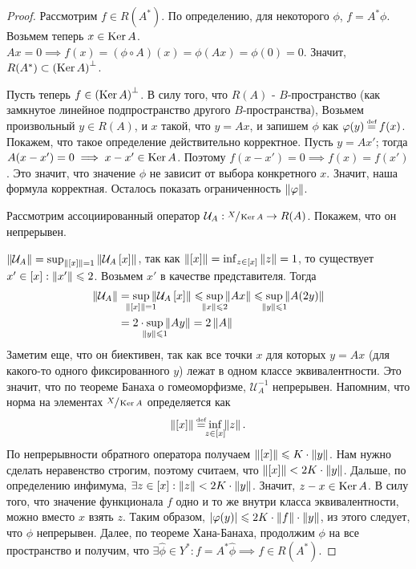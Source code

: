 \begin{proof}
	Рассмотрим $f \in R(A^*)$. По определению, для некоторого $\phi$, $f = A^*\phi$.
	Возьмем теперь $x \in \operatorname{Ker} A$. $Ax = 0 \implies f(x) = (\phi \circ A)(x) = \phi(Ax) = \phi(0) = 0$.
	Значит, $R(A^*) \subset \left( \operatorname{Ker} A\right)^\bot$.
	
	Пусть теперь $f \in \left( \operatorname{Ker} A\right)^\bot$. В силу того, что $R(A)$ - $B$-пространство
	(как замкнутое линейное подпространство другого $B$-пространства),
	Возьмем произвольный $y \in R(A)$, и $x$ такой, что $y = Ax$,
	и запишем $\phi$ как $\phi(y) \defeq f(x)$. Покажем, что такое определение
	действительно корректное.
	Пусть $y = Ax'$; тогда $A(x - x') = 0 \implies x - x' \in \operatorname{Ker} A$.
	Поэтому $f(x - x') = 0 \implies f(x) = f(x')$. Это значит, что значение $\phi$ не
	зависит от выбора конкретного $x$. Значит, наша формула корректная.
	Осталось показать ограниченность $\left\|\varphi\right\|$.

	Рассмотрим ассоциированный оператор
	$\mathcal{U}_A : \sfrac{X}{\operatorname{Ker} A} \rightarrow R(A)$.
	Покажем, что он непрерывен.

	$\left\|\mathcal{U}_A\right\| = \sup_{\left\|\left[x \right]\right\| = 1} \left\|\mathcal{U}_A\left[x \right]\right\|$,
	так как $\left\|\left[x \right]\right\| = \inf_{z \in \left[x \right]} \left\|z\right\| = 1$,
	то существует $x' \in \left[x \right] : \left\|x'\right\| \leqslant 2$.
	Возьмем $x'$ в качестве представителя. Тогда
	\begin{equation}
		\begin{split}
			\norm{\mathcal{U}_A} & =
            \sup_{\mathclap{\norm{\eqcls{x}} = 1}} \norm{\mathcal{U}_A\eqcls{x}}
            \leqslant \sup_{\mathclap{\norm{x} \leqslant 2}} \norm{Ax}
            \leqslant \sup_{\mathclap{\norm{y} \leqslant 1}} \norm{A(2y)} \\
            & = 2 \cdot \sup_{\mathclap{\norm{y} \leqslant 1}} \norm{Ay}
			= 2 \norm{A}
		\end{split}
	\end{equation}
	Заметим еще, что он биективен, так как все точки $x$ для которых $y = Ax$
	(для какого-то одного фиксированного $y$) лежат в одном классе эквивалентности.
    Это значит, что по теореме Банаха о гомеоморфизме, $\mathcal{U}_A^{-1}$ непрерывен.
    Напомним, что норма на элементах $\sfrac{X}{\operatorname{Ker} A}$ определяется как
	\begin{gather}
        \norm{\eqcls{x}} \defeq \inf_{\mathclap{z \in \eqcls{x}}} \norm{z}\text{.}
	\end{gather}
	По непрерывности обратного оператора получаем $\left\|\left[x \right]\right\| \leqslant K \cdot \left\|y\right\|$.
	Нам нужно сделать неравенство строгим, поэтому считаем, что
	$\left\|\left[x \right]\right\| < 2K \cdot \left\|y\right\|$. Дальше, по определению инфимума,
	$\exists z \in \left[x \right] : \left\|z\right\| < 2K \cdot \left\|y\right\|$. Значит, $z - x \in \operatorname{Ker} A$.
	В силу того, что значение функционала $f$ одно и то же внутри класса эквивалентности,
	можно вместо $x$ взять $z$. Таким образом,
	$\left|\varphi(y)\right| \leqslant 2K \cdot \left\|f\right\| \cdot \left\|y\right\|$, из этого следует, что
	$\phi$ непрерывен.
	Далее, по теореме Хана-Банаха, продолжим $\phi$ на все пространство и получим, что
	$\exists \widehat{\phi} \in Y^* : f = A^*\widehat{\phi} \implies f \in R(A^*)$.
\end{proof}
